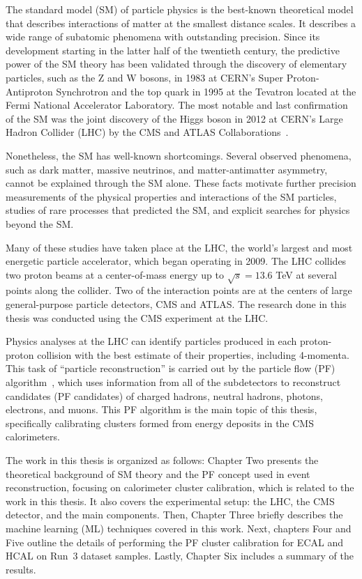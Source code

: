 
The standard model (SM) of particle physics is the best-known theoretical model that describes interactions of matter at the smallest distance scales.
It describes a wide range of subatomic phenomena with outstanding precision.
Since its development starting in the latter half of the twentieth century,
the predictive power of the SM theory has been validated through the discovery of elementary particles, such as the Z and W bosons,
in 1983 at CERN's Super Proton-Antiproton Synchrotron and the top quark in 1995 at the Tevatron located at the Fermi National Accelerator Laboratory.
The most notable and last confirmation of the SM was the joint discovery of the Higgs boson in 2012 at CERN's Large Hadron Collider (LHC) by the CMS and
ATLAS Collaborations~\cite{ATLAS:2012yve,CMS:2012qbp,CMS:2013btf}.

Nonetheless, the SM has well-known shortcomings.
Several observed phenomena, such as dark matter, massive neutrinos, and matter-antimatter asymmetry, cannot be explained through the SM alone.
These facts motivate further precision measurements of the physical properties and interactions of the SM particles, studies of rare processes that predicted the SM,
and explicit searches for physics beyond the SM.

Many of these studies have taken place at the LHC, the world's largest and most energetic particle accelerator, which began operating in 2009.
The LHC collides two proton beams at a center-of-mass energy up to $\sqrt{s}=13.6$ TeV at several points along the collider.
Two of the interaction points are at the centers of large general-purpose particle detectors, CMS and ATLAS.
The research done in this thesis was conducted using the CMS experiment at the LHC.

Physics analyses at the LHC can identify particles produced in each proton-proton collision with the best estimate of their properties, including 4-momenta.
This task of ``particle reconstruction'' is carried out by the particle flow (PF) algorithm~\cite{PF}, which uses information from all of the subdetectors to reconstruct candidates (PF candidates) of charged hadrons, neutral hadrons, photons, electrons, and muons.
This PF algorithm is the main topic of this thesis, specifically calibrating clusters formed from energy deposits in the CMS calorimeters.

The work in this thesis is organized as follows:
Chapter Two presents the theoretical background of SM theory and the PF concept used in event reconstruction, focusing on calorimeter cluster calibration,
which is related to the work in this thesis.
It also covers the experimental setup: the LHC, the CMS detector, and the main components. Then, Chapter Three briefly describes the machine learning (ML) techniques covered in this work.
Next, chapters Four and Five outline the details of performing the PF cluster calibration for ECAL and HCAL on Run~3 dataset samples.
Lastly, Chapter Six includes a summary of the results.
